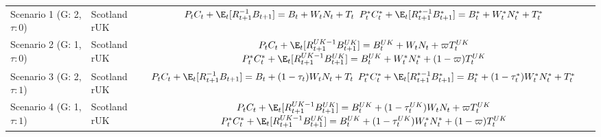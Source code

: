 \begin{table}[H]
    \centering
    \begin{tabular}{l|l|c}
    \makecell{Scenario 1 \\ (G: 2, $\tau: 0$)} & \makecell{Scotland \\ rUK } & 
        \makecell{
            $P_t C_t + \E_t [{R^{-1}_{t+1}}B_{t+1}] = B_t + W_t N_t + T_t$ \\
            $P^*_t C^*_t + \E_t [{R^{*-1}_{t+1}}B^*_{t+1}] = B^*_t + W^*_t N^*_t + T^*_t$
        }  \\ 
    \makecell{Scenario 2 \\ (G: 1, $\tau: 0$)} & \makecell{Scotland \\ rUK } & 
        \makecell{
            $P_t C_t + \E_t [{R^{UK-1}_{t+1}}B^{UK}_{t+1}] = B^{UK}_t + W_t N_t + \varpi T^{UK}_t$ \\
            $P^*_t C^*_t + \E_t [{R^{UK-1}_{t+1}}B^{UK}_{t+1}] = B^{UK}_t + W^*_t N^*_t + (1-\varpi)T^{UK}_t$
        }   \\ 
    \makecell{Scenario 3 \\ (G: 2, $\tau: 1$)} & \makecell{Scotland \\ rUK } & 
    \makecell{
        $P_t C_t + \E_t [{R^{-1}_{t+1}}B_{t+1}] = B_t + (1-\tau_t)W_t N_t + T_t$ \\
        $P^*_t C^*_t + \E_t [{R^{*-1}_{t+1}}B^*_{t+1}] = B^*_t + (1-\tau^*_t)W^*_t N^*_t + T^*_t$ 
    }  \\
    \makecell{Scenario 4 \\ (G: 1, $\tau: 1$)} & \makecell{Scotland \\ rUK } & 
    \makecell{
        $P_t C_t + \E_t [{R^{UK-1}_{t+1}}B^{UK}_{t+1}] = B^{UK}_t + (1-\tau^{UK}_t)W_t N_t + \varpi T^{UK}_t$ \\
        $P^*_t C^*_t + \E_t [{R^{UK-1}_{t+1}}B^{UK}_{t+1}] = B^{UK}_t + (1-\tau^{UK}_t)W^*_t N^*_t + (1-\varpi)T^{UK}_t$
    }  
    \end{tabular}
    \end{table}